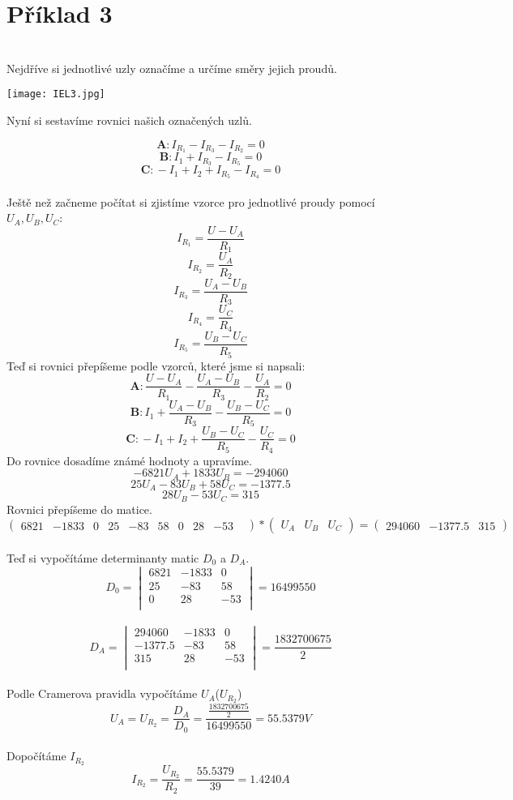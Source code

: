 \section{Příklad 3}
\noindent\makebox[\linewidth]{\rule{\textwidth}{0.3pt}}\\
Nejdříve si jednotlivé uzly označíme a určíme směry jejich proudů.\\
\begin{center}
    \texttt{[image: IEL3.jpg]}
\end{center}
Nyní si sestavíme rovnici našich označených uzlů.

$$\boldsymbol{A:} I_{R_1}-I_{R_3}-I_{R_2}=0$$
$$\boldsymbol{B:} I_{1}+I_{R_3}-I_{R_5}=0$$
$$\boldsymbol{C:} -I_{1}+I_{2}+I_{R_5}-I_{R_4}=0$$
\pagebreak
\\
Ještě než začneme počítat si zjistíme vzorce pro jednotlivé proudy pomocí $U_A, U_B, U_C$:\\
$$I_{R_1}=\frac{U-U_A}{R_1}$$
$$I_{R_2}=\frac{U_A}{R_2}$$
$$I_{R_3}=\frac{U_A-U_B}{R_3}$$
$$I_{R_4}=\frac{U_C}{R_4}$$
$$I_{R_5}=\frac{U_B-U_C}{R_5}$$
Teď si rovnici přepíšeme podle vzorců, které jsme si napsali:\\
$$\boldsymbol{A:} \frac{U-U_A}{R_1}-\frac{U_A-U_B}{R_3}-\frac{U_A}{R_2}=0$$
$$\boldsymbol{B:} I_1+\frac{U_A-U_B}{R_3}-\frac{U_B-U_C}{R_5}=0$$
$$\boldsymbol{C:} -I_1+I_2+\frac{U_B-U_C}{R_5}-\frac{U_C}{R_4}=0$$
Do rovnice dosadíme známé hodnoty a upravíme.\\
$$-6821U_A+1833U_B=-294060$$
$$25U_A-83U_B+58U_C=-1377.5$$
$$28U_B-53U_C=315$$
Rovnici přepíšeme do matice.\\
$$
\left (
\begin{array}{ccc}
6821 & -1833 & 0 & 
25&-83&58&
0&28&-53&
\end{array}
\right ) 
*
\left (
\begin{array}{c}
U_A & U_B & U_C
\end{array}
\right )
=
\left (
\begin{array}{c}
294060 & -1377.5 & 315
\end{array}
\right )
$$
\\
Teď si vypočítáme determinanty matic $D_0$ a $D_A$.
$$
D_0 = 
\begin{vmatrix}
6821 & -1833 & 0 \\
25 &-83&58\\
0 & 28 &-53\\
\end{vmatrix}
=16499550
$$
\\
$$
D_A = 
\begin{vmatrix}
294060 & -1833 & 0 \\
-1377.5 &-83&58\\
315 & 28 &-53\\
\end{vmatrix}
= \frac{1832700675}{2}
$$
\\
Podle Cramerova pravidla vypočítáme $U_A$($U_{R_2}$) \\
$$U_A=U_{R_2}=\frac{D_A}{D_0}=\frac{\frac{1832700675}{2}}{16499550}=55.5379V$$\\
Dopočítáme $I_{R_2}$\\
$$I_{R_2}=\frac{U_{R_2}}{R_2}=\frac{55.5379}{39}=1.4240A$$